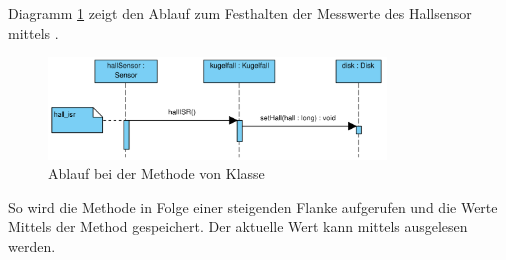 Diagramm \ref{fig:hallISR} zeigt den Ablauf zum Festhalten der Messwerte des Hallsensor mittels .
\begin{figure}[htbp]
	\centering
	\includegraphics[width=0.8\textwidth]{abb/hallISR_cropped}
	\caption{Ablauf bei der Methode  von Klasse }
	\label{fig:hallISR}
\end{figure}
So wird die Methode  in Folge einer steigenden Flanke aufgerufen und die Werte Mittels der Method  gespeichert.
Der aktuelle Wert kann mittels  ausgelesen werden.